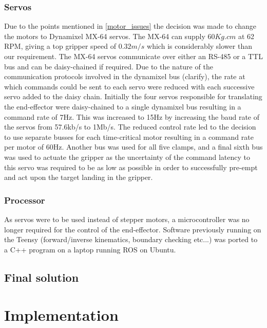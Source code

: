 \documentclass[conference]{IEEEtran}
\begin{document}
	\subsubsection{Servos}
	Due to the points mentioned in \ref{motor_issues} the decision was made to change the motors to Dynamixel MX-64 servos. The MX-64 can supply $60Kg.cm$ at 62 RPM, giving a top gripper speed of $0.32m/s$ which is considerably slower than our requirement. The MX-64 servos communicate over either an RS-485 or a TTL bus and can be daisy-chained if required. Due to the nature of the communication protocols involved in the dynamixel bus (clarify), the rate at which commands could be sent to each servo were reduced with each successive servo added to the daisy chain. Initially the four servos responsible for translating the end-effector were daisy-chained to a single dynamixel bus resulting in a command rate of 7Hz. This was increased to 15Hz by increasing the baud rate of the servos from 57.6kb/s to 1Mb/s. The reduced control rate led to the decision to use separate busses for each time-critical motor resulting in a command rate per motor of 60Hz. Another bus was used for all five clamps, and a final sixth bus was used to actuate the gripper as the uncertainty of the command latency to this servo was required to be as low as possible in order to successfully pre-empt and act upon the target landing in the gripper. 
	
	\subsubsection{Processor}
	As servos were to be used instead of stepper motors, a microcontroller was no longer required for the control of the end-effector. Software previously running on the Teensy (forward/inverse kinematics, boundary checking etc...) was ported to a C++ program on a laptop running ROS on Ubuntu. 
	\subsection{Final solution}
	
	
	\section{Implementation}
\end{document}
